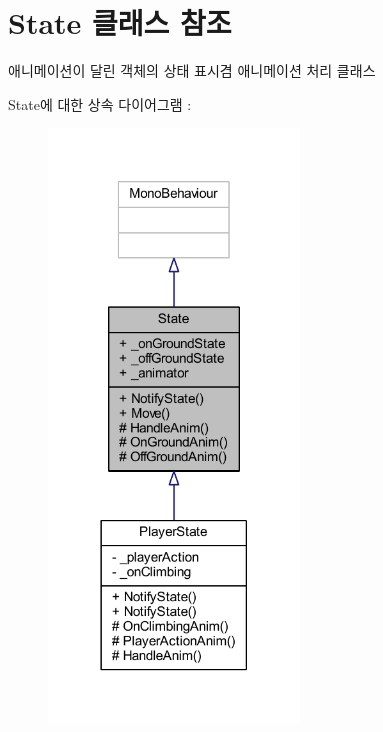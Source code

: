 \hypertarget{class_state}{}\section{State 클래스 참조}
\label{class_state}


애니메이션이 달린 객체의 상태 표시겸 애니메이션 처리 클래스  




State에 대한 상속 다이어그램 \+: \nopagebreak
\begin{figure}[H]
\begin{center}
\leavevmode
\includegraphics[width=189pt]{de/d06/class_state__inherit__graph}
\end{center}
\end{figure}


